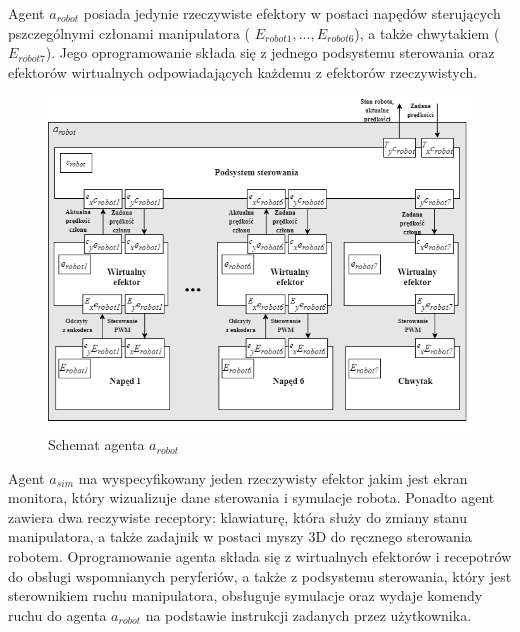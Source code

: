 \documentclass[a4paper, 12pt, twoside]{article}
\begin{document}
Agent $a_{robot}$ posiada jedynie rzeczywiste efektory w postaci napędów sterujących pszczególnymi członami manipulatora ( $E_{robot1}, ...,  E_{robot6}$), a także chwytakiem ($E_{robot7}$). Jego oprogramowanie składa się z jednego podsystemu sterowania oraz efektorów wirtualnych odpowiadających każdemu z efektorów rzeczywistych.

\begin{figure}[hbt!]
\centering
\includegraphics[width=1.0\linewidth]{images/agent_robot.png}
\caption{Schemat agenta $a_{robot}$ }
\label{fig:agent_robot}
\end{figure}

Agent $a_{sim}$ ma wyspecyfikowany jeden rzeczywisty efektor jakim jest ekran monitora, który wizualizuje dane sterowania i symulacje robota. Ponadto agent zawiera dwa reczywiste receptory: klawiaturę, która służy do zmiany stanu manipulatora, a także zadajnik w postaci myszy 3D do ręcznego sterowania robotem. Oprogramowanie agenta składa się z wirtualnych efektorów i recepotrów do obsługi wspomnianych peryferiów, a także z podsystemu sterowania, który jest sterownikiem ruchu manipulatora, obsługuje symulacje oraz wydaje komendy ruchu do agenta $a_{robot}$ na podstawie instrukcji zadanych przez użytkownika.
\end{document}
